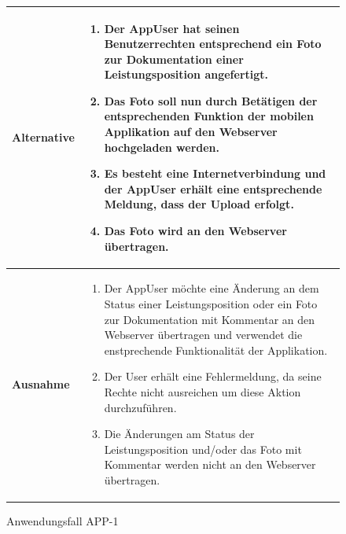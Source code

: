 			\begin{figure}[h]
	\centering
	\begin{tabularx}{\textwidth}{ X | X }
		\textbf{Alternative} & 
				\begin{enumerate}
					 \item Der AppUser hat seinen Benutzerrechten entsprechend ein Foto zur Dokumentation einer Leistungsposition angefertigt.
					 \item Das Foto soll nun durch Bet\"atigen der entsprechenden Funktion der mobilen Applikation auf den Webserver hochgeladen werden.
					 \item Es besteht eine Internetverbindung und der AppUser erh\"alt eine entsprechende Meldung,  dass der Upload erfolgt.
					 \item Das Foto wird an den Webserver \"ubertragen.
				\end{enumerate}  \\ \hline
						\textbf{Ausnahme} &
				\begin{enumerate}
					 \item Der AppUser m\"ochte eine \"Anderung an dem Status einer Leistungsposition oder ein Foto zur Dokumentation mit Kommentar an den Webserver \"ubertragen und verwendet die enstprechende Funktionalit\"at der Applikation.
					 \item Der User erh\"alt eine Fehlermeldung, da seine Rechte nicht ausreichen um diese Aktion durchzuf\"uhren.
					 \item Die \"Anderungen am Status der Leistungsposition und/oder das Foto mit Kommentar werden nicht an den Webserver \"ubertragen.
					 \end{enumerate} \\ \hline
	\end{tabularx}
	\caption{Anwendungsfall APP-1}
	\label{fig:anwendungsfall-app-tabelle-APP-1-2}
\end{figure}

